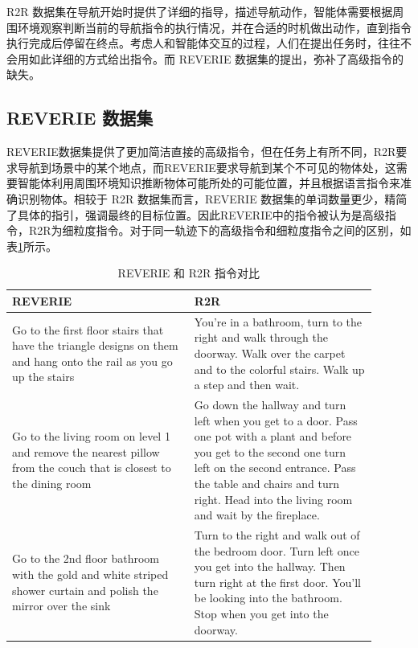 \documentclass[bachelor]{thesis-uestc}
\begin{document}

R2R 数据集在导航开始时提供了详细的指导，描述导航动作，智能体需要根据周围环境观察判断当前的导航指令的执行情况，并在合适的时机做出动作，直到指令执行完成后停留在终点。考虑人和智能体交互的过程，人们在提出任务时，往往不会用如此详细的方式给出指令。而 REVERIE 数据集的提出，弥补了高级指令的缺失。

\subsection{REVERIE 数据集}
REVERIE数据集提供了更加简洁直接的高级指令，但在任务上有所不同，R2R要求导航到场景中的某个地点，而REVERIE要求导航到某个不可见的物体处，这需要智能体利用周围环境知识推断物体可能所处的可能位置，并且根据语言指令来准确识别物体。相较于 R2R 数据集而言，REVERIE 数据集的单词数量更少，精简了具体的指引，强调最终的目标位置。因此REVERIE中的指令被认为是高级指令，R2R为细粒度指令。对于同一轨迹下的高级指令和细粒度指令之间的区别，如表\ref{rvr2r}所示。

\begin{table}[h]
    \centering
    \caption{REVERIE 和 R2R 指令对比}
    \label{rvr2r}
    \begin{tabular}{@{}p{0.45\linewidth}p{0.45\linewidth}@{}}
    \toprule
    \textbf{REVERIE} & \textbf{R2R} \\ \midrule
    Go to the first floor stairs that have the triangle designs on them and hang onto the rail as you go up the stairs & You're in a bathroom, turn to the right and walk through the doorway. Walk over the carpet and to the colorful stairs. Walk up a step and then wait. \\
    Go to the living room on level 1 and remove the nearest pillow from the couch that is closest to the dining room & Go down the hallway and turn left when you get to a door. Pass one pot with a plant and before you get to the second one turn left on the second entrance. Pass the table and chairs and turn right. Head into the living room and wait by the fireplace. \\
    Go to the 2nd floor bathroom with the gold and white striped shower curtain and polish the mirror over the sink & Turn to the right and walk out of the bedroom door. Turn left once you get into the hallway. Then turn right at the first door. You'll be looking into the bathroom. Stop when you get into the doorway. \\
    \bottomrule
    \end{tabular}
    \end{table}
\end{document}
